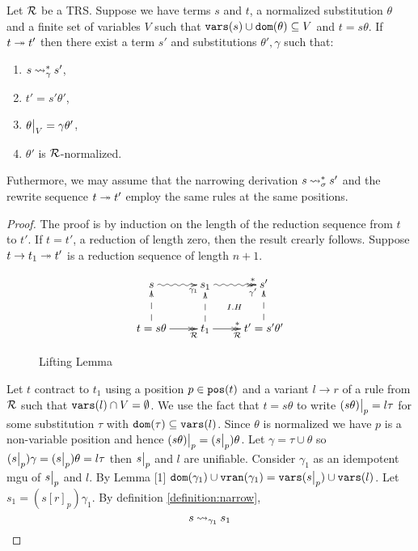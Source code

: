 \begin{lemma}\label{lemma:lifting-lemma-ordinary-narrowing}
	Let $\mathcal{R}$ be a TRS. Suppose we have terms $s$ and $t$, a normalized substitution $\theta$ and a finite set of variables $V$ such that $\mathtt{vars}(s) \cup \mathtt{dom}(\theta) \subseteq V$ and $t = s\theta$. If $t \twoheadrightarrow t'$ then there exist a term $s'$ and substitutions $\theta', \gamma$ such that:
	\begin{enumerate}
		\item $s \mathbin{\rightsquigarrow}^{*}_{\gamma} s'$,
		\item $t' = s'\theta'$,
		\item $\restr{\theta}{V} = \gamma\theta'$,
		\item $\theta'$ is $\mathcal{R}$-normalized.
	\end{enumerate}
	Futhermore, we may assume that the narrowing derivation $s \mathbin{\rightsquigarrow}^{*}_{\sigma} s'$ and the rewrite sequence $t \twoheadrightarrow t'$ employ the same rules at the same positions.

	\begin{proof}
		The proof is by induction on the length of the reduction sequence from $t$ to $t'$. If $t = t'$, a reduction of length zero, then the result crearly follows. Suppose $t \rightarrow t_1 \twoheadrightarrow t'$ is a reduction sequence of length $n+1$.

		\begin{figure}[h!]
			\begin{displaymath}
				\xymatrix{
                    s \ar@{~>}[r]_>>{\gamma_1} & s_1 \ar@{}[dr]|{I.H} \ar@{~>>}[r]_>>{\gamma'}^>>{*} & s' \\
                    t = s\theta \ar@{-->}[u] \ar@{->>}[r]_>>{\trs} & \ar@{-->}[u] t_1 \ar@{->>}[r]_>>{\trs}^>>{*} & t' = s'\theta' \ar@{-->}[u]
				}
			\end{displaymath}
			\caption{Lifting Lemma}
			\label{figure:lifting-lemma}
        \end{figure}

		Let $t$ contract to $t_1$ using a position $p \in \mathtt{pos}(t)$ and a variant $l \rightarrow r$ of a rule from $\mathcal{R}$ such that $\mathtt{vars}(l) \cap V = \emptyset$. We use the fact that $t = s\theta$ to write $\restr{(s\theta)}{p} = l \tau$ for some substitution $\tau$ with $\mathtt{dom}(\tau) \subseteq \mathtt{vars}(l)$. Since $\theta$ is normalized we have $p$ is a non-variable position and hence $\restr{(s\theta)}{p} = (\restr{s}{p})\theta$. Let $\gamma = \tau \cup \theta$ so $(\restr{s}{p})\gamma = (\restr{s}{p})\theta = l \tau$ then $\restr{s}{p}$ and $l$ are unifiable. Consider $\gamma_1$ as an idempotent mgu of $\restr{s}{p}$ and $l$. By Lemma [1] $\dom{\gamma_1} \cup \vran{\gamma_1} = \vars{\restr{s}{p}} \cup \vars{l}$. Let $s_1 = (s[r]_p)\gamma_1$. By definition \ref{definition:narrow},
		\begin{equation}\label{lifting-lemma:eqn:s-narrows-s_1}
			s \mathbin{\rightsquigarrow}_{\gamma_1} s_1
		\end{equation}


\end{proof}
\end{lemma}

